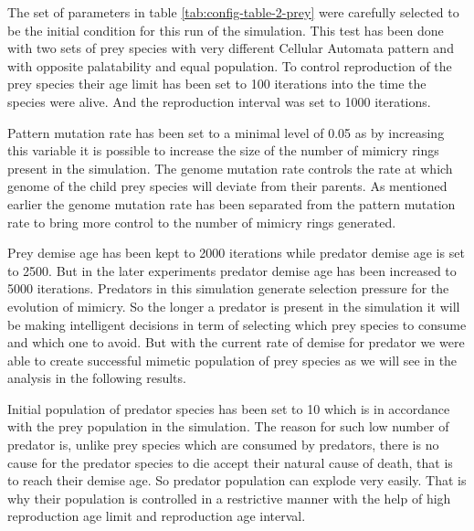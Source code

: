 \documentclass[letterpaper]{article}
\numberwithin{equation}{section}
\begin{document}
The set of parameters in table \ref{tab:config-table-2-prey} were carefully selected to be the initial condition for this run of the simulation. This test has been done with two sets of prey species with very different Cellular Automata pattern and with opposite palatability and equal population. To control reproduction of the prey species their age limit has been set to 100 iterations into the time the species were alive. And the reproduction interval was set to 1000 iterations.

Pattern mutation rate has been set to a minimal level of 0.05 as by increasing this variable it is possible to increase the size of the number of mimicry rings present in the simulation. The genome mutation rate controls the rate at which genome of the child prey species will deviate from their parents. As mentioned earlier the genome mutation rate has been separated from the pattern mutation rate to bring more control to the number of mimicry rings generated.

Prey demise age has been kept to 2000 iterations while predator demise age is set to 2500. But in the later experiments predator demise age has been increased to 5000 iterations. Predators in this simulation generate selection pressure for the evolution of mimicry. So the longer a predator is present in the simulation it will be making intelligent decisions in term of selecting which prey species to consume and which one to avoid. But with the current rate of demise for predator we were able to create successful mimetic population of prey species as we will see in the analysis in the following results.

Initial population of predator species has been set to 10 which is in accordance with the prey population in the simulation. The reason for such low number of predator is, unlike prey species which are consumed by predators, there is no cause for the predator species to die accept their natural cause of death, that is to reach their demise age. So predator population can explode very easily. That is why their population is controlled in a restrictive manner with the help of high reproduction age limit and reproduction age interval.
\end{document}
